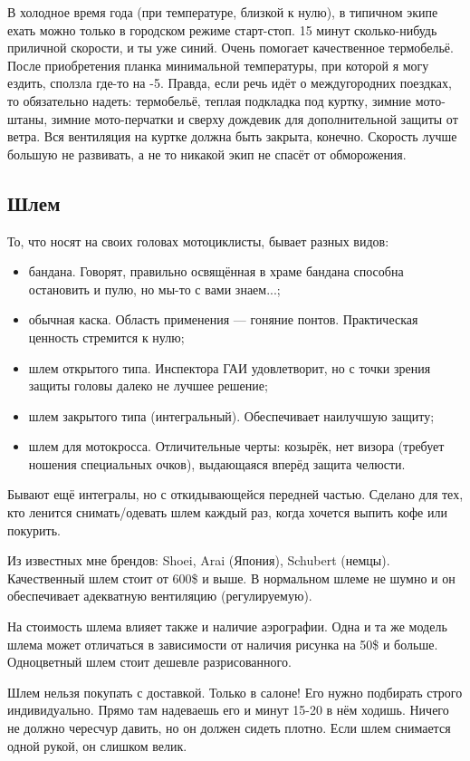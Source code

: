 \documentclass[12pt,a4paper]{article}
\begin{document}
В холодное время года (при температуре, близкой к нулю), в типичном
экипе ехать можно только в городском режиме старт-стоп. 15 минут
сколько-нибудь приличной скорости, и ты уже синий. Очень помогает
качественное термобельё. После приобретения планка минимальной
температуры, при которой я могу ездить, сползла где-то на -5. Правда,
если речь идёт о междугородних поездках, то обязательно надеть:
термобельё, теплая подкладка под куртку, зимние мото-штаны, зимние
мото-перчатки и сверху дождевик для дополнительной защиты от ветра.
Вся вентиляция на куртке должна быть закрыта, конечно. Скорость лучше
большую не развивать, а не то никакой экип не спасёт от обморожения.

\subsection{Шлем}

То, что носят на своих головах мотоциклисты, бывает разных видов:

\begin{itemize}
\item бандана. Говорят, правильно освящённая в храме бандана способна
остановить и пулю, но мы-то с вами знаем...;
\item обычная каска. Область применения --- гоняние понтов. Практическая
ценность стремится к нулю;
\item шлем открытого типа. Инспектора ГАИ удовлетворит, но с точки
зрения защиты головы далеко не лучшее решение;
\item шлем закрытого типа (интегральный). Обеспечивает наилучшую защиту;
\item шлем для мотокросса. Отличительные черты: козырёк, нет визора
(требует ношения специальных очков), выдающаяся вперёд защита челюсти.
\end{itemize}

Бывают ещё интегралы, но с откидывающейся передней частью. Сделано для
тех, кто ленится снимать/одевать шлем каждый раз, когда хочется выпить
кофе или покурить.

Из известных мне брендов: Shoei, Arai (Япония), Schubert (немцы).
Качественный шлем стоит от 600\$ и выше. В нормальном шлеме не шумно и
он обеспечивает адекватную вентиляцию (регулируемую).

На стоимость шлема влияет также и наличие аэрографии. Одна и та же
модель шлема может отличаться в зависимости от наличия рисунка на 50\$
и больше. Одноцветный шлем стоит дешевле разрисованного.

Шлем нельзя покупать с доставкой. Только в салоне! Его нужно подбирать
строго индивидуально. Прямо там надеваешь его и минут 15-20 в нём
ходишь. Ничего не должно чересчур давить, но он должен сидеть плотно.
Если шлем снимается одной рукой, он слишком велик.
\end{document}
